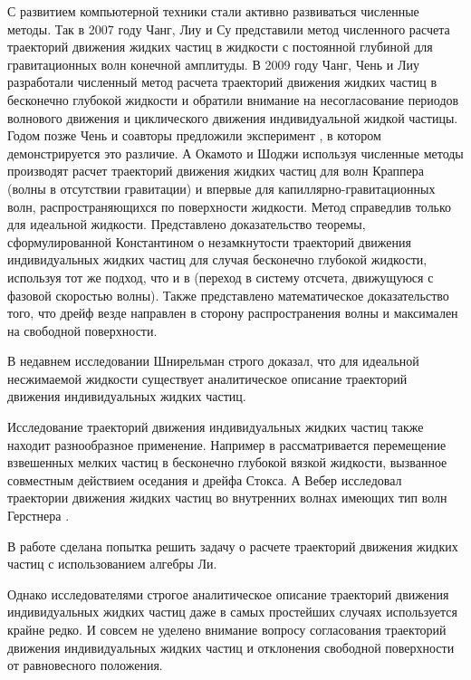 С развитием компьютерной техники стали активно развиваться численные методы. Так в 2007 году Чанг, Лиу и Су представили метод численного расчета траекторий движения жидких частиц в жидкости с постоянной глубиной \cite{chang2007particle} для гравитационных волн конечной амплитуды. В 2009 году Чанг, Чень и Лиу \cite{chang2009particle} разработали численный метод расчета траекторий движения жидких частиц в бесконечно глубокой жидкости и обратили внимание на несогласование периодов волнового движения и циклического движения индивидуальной жидкой частицы. Годом позже Чень и соавторы предложили эксперимент \cite{chen2010lagrangian}, в котором демонстрируется это различие. А Окамото и Шоджи \cite{okamoto2012trajectories} используя численные методы производят расчет траекторий движения жидких частиц для волн Краппера (волны в отсутствии гравитации) и впервые для капиллярно-гравитационных волн, распространяющихся по поверхности жидкости. Метод справедлив только для идеальной жидкости. Представлено доказательство теоремы, сформулированной Константином \cite{constantin2006trajectories} о незамкнутости траекторий движения индивидуальных жидких частиц для случая бесконечно глубокой жидкости, используя тот же подход, что и в \cite{constantin2006trajectories} (переход в систему отсчета, движущуюся с фазовой скоростью волны). Также представлено математическое доказательство того, что дрейф везде направлен в сторону распространения волны и максимален на свободной поверхности.




В недавнем исследовании Шнирельман \cite{shnirelman2012analyticity} строго доказал, что для идеальной несжимаемой жидкости существует аналитическое описание траекторий движения индивидуальных жидких частиц. 

Исследование траекторий движения индивидуальных жидких частиц также находит разнообразное применение. Например в \cite{santamaria2013stokes} рассматривается перемещение взвешенных мелких частиц в бесконечно глубокой вязкой жидкости, вызванное совместным действием оседания и дрейфа Стокса. А Вебер исследовал траектории движения жидких частиц во внутренних волнах имеющих тип волн Герстнера \cite{weber2018interfacial}.

В работе \cite{abd2013new} сделана попытка решить задачу о расчете траекторий движения жидких частиц с использованием алгебры Ли.


Однако исследователями строгое аналитическое описание траекторий движения индивидуальных жидких частиц даже в самых простейших случаях используется крайне редко. И совсем не уделено внимание вопросу согласования траекторий движения индивидуальных жидких частиц и отклонения свободной поверхности от равновесного положения.



